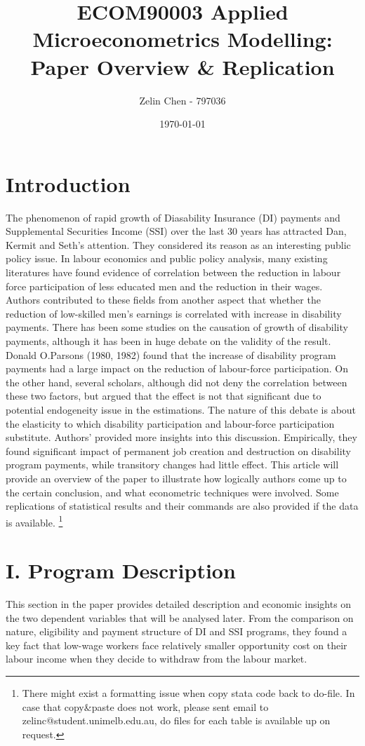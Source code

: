 \documentclass{article} %
\title{ECOM90003 Applied Microeconometrics Modelling: \\ Paper Overview \& Replication}
\author{Zelin Chen - 797036}
\date{\today}
\begin{document}
 
\maketitle

\section{Introduction}
The phenomenon of rapid growth of Diasability Insurance (DI) payments and Supplemental Securities Income (SSI) over the last 30 years has attracted Dan, Kermit and Seth's attention.\cite{DKS2002} They considered its reason as an interesting public policy issue. In labour economics and public policy analysis, many existing literatures have found evidence of correlation between the reduction in labour force participation of less educated men and the reduction in their wages. Authors contributed to these fields from another aspect that whether the reduction of low-skilled men's earnings is correlated with increase in disability payments. 
There has been some studies on the causation of growth of disability payments, although it has been in huge debate on the validity of the result. Donald O.Parsons (1980, 1982) found that the increase of disability program payments had a large impact on the reduction of labour-force participation.  
On the other hand, several scholars, although did not deny the correlation between these two factors, but argued that the effect is not that significant due to potential endogeneity issue in the estimations. The nature of this debate is about the elasticity to which disability participation and labour-force participation substitute.  Authors' provided more insights into this discussion. Empirically, they found significant impact of permanent job creation and destruction on disability program payments, while transitory changes had little effect. This article will provide an overview of the paper to illustrate how logically authors come up to the certain conclusion, and what econometric techniques were involved. Some replications of statistical results and their commands are also provided if the data is available. \footnote{There might exist a formatting issue when copy stata code back to do-file. In case that copy\&paste does not work, please sent email to zelinc@student.unimelb.edu.au, do files for each table is available up on request. }

\section{I. Program Description}
This section in the paper provides detailed description and economic insights on the two dependent variables that will be analysed later. From the comparison on nature, eligibility and payment structure of DI and SSI programs, they found a key fact that low-wage workers face relatively smaller opportunity cost on their labour income when they decide to withdraw from the labour market.
\end{document}
